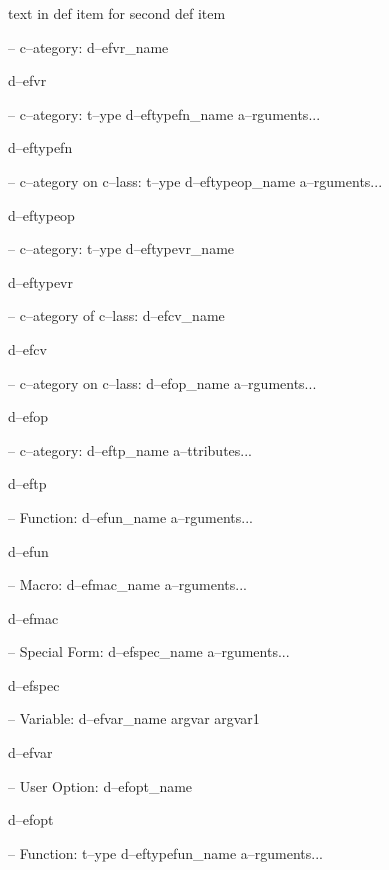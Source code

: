 \documentclass{book}
\begin{document}
\begin{titlepage}
%
text in def item for second def item

\hbox{}-- c--ategory: d--efvr\_name


%
d--efvr

\hbox{}-- c--ategory: t--ype d--eftypefn\_name a--rguments...


%
d--eftypefn

\hbox{}-- c--ategory on c--lass: t--ype d--eftypeop\_name a--rguments...


%
d--eftypeop

\hbox{}-- c--ategory: t--ype d--eftypevr\_name


%
d--eftypevr

\hbox{}-- c--ategory of c--lass: d--efcv\_name


%
d--efcv

\hbox{}-- c--ategory on c--lass: d--efop\_name a--rguments...


%
d--efop

\hbox{}-- c--ategory: d--eftp\_name a--ttributes...


%
d--eftp

\hbox{}-- Function: d--efun\_name a--rguments...


%
d--efun

\hbox{}-- Macro: d--efmac\_name a--rguments...


%
d--efmac

\hbox{}-- Special Form: d--efspec\_name a--rguments...


%
d--efspec

\hbox{}-- Variable: d--efvar\_name argvar argvar1


%
d--efvar

\hbox{}-- User Option: d--efopt\_name


%
d--efopt

\hbox{}-- Function: t--ype d--eftypefun\_name a--rguments...



\end{titlepage}
\end{document}
